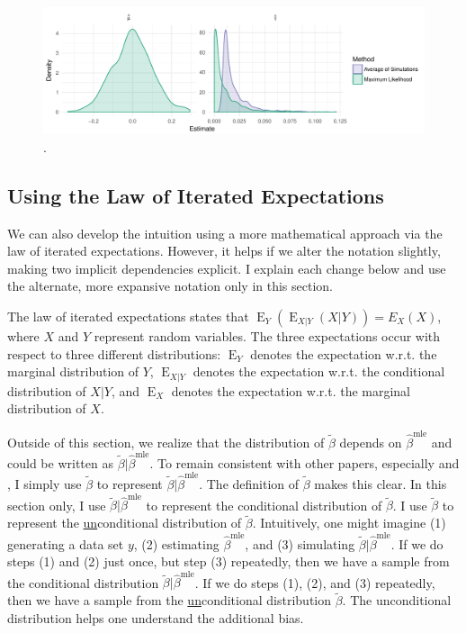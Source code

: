 \documentclass[10pt]{article}
\DeclareMathOperator*{\E}{\text{E}}
\begin{document}
\begin{figure}[h!]
\begin{center}
\includegraphics[scale = 0.6]{figs/intuition-sampling.pdf}
\caption{.}\label{fig:int-samp}
\end{center}
\end{figure}

\subsection*{Using the Law of Iterated Expectations}

We can also develop the intuition using a more mathematical approach via the law of iterated expectations. 
However, it helps if we alter the notation slightly, making two implicit dependencies explicit. 
I explain each change below and use the alternate, more expansive notation only in this section.
 
The law of iterated expectations states that $\E_Y \left( \E_{X|Y}(X | Y) \right) = E_X(X)$, where $X$ and $Y$ represent random variables. 
The three expectations occur with respect to three different distributions: $\E_Y$ denotes the expectation w.r.t. the marginal distribution of $Y$, $\E_{X|Y}$ denotes the expectation w.r.t. the conditional distribution of $X | Y$, and $\E_X$ denotes the expectation w.r.t. the marginal distribution of $X$. 

Outside of this section, we realize that the distribution of $\tilde{\beta}$ depends on $\hat{\beta}^\text{mle}$ and could be written as $\tilde{\beta} | \hat{\beta}^\text{mle}$. 
To remain consistent with other papers, especially \cite{KingTomzWittenberg2000} and \cite{Herron1999}, I simply use $\tilde{\beta}$ to represent $\tilde{\beta} | \hat{\beta}^\text{mle}$.
The definition of $\tilde{\beta}$ makes this clear. 
In this section only, I use $\tilde{\beta} | \hat{\beta}^\text{mle}$ to represent the conditional distribution of $\tilde{\beta}$. 
I use $\tilde{\beta}$ to represent the \underline{un}conditional distribution of $\tilde{\beta}$.
Intuitively, one might imagine (1) generating a data set $y$, (2) estimating $\hat{\beta}^\text{mle}$, and (3) simulating $\tilde{\beta} | \hat{\beta}^\text{mle}$. 
If we do steps (1) and (2) just once, but step (3) repeatedly, then we have a sample from the conditional distribution $\tilde{\beta} | \hat{\beta}^\text{mle}$. 
If we do steps (1), (2), and (3) repeatedly, then we have a sample from the \underline{un}conditional distribution $\tilde{\beta}$. 
The unconditional distribution helps one understand the additional bias.
\end{document}
